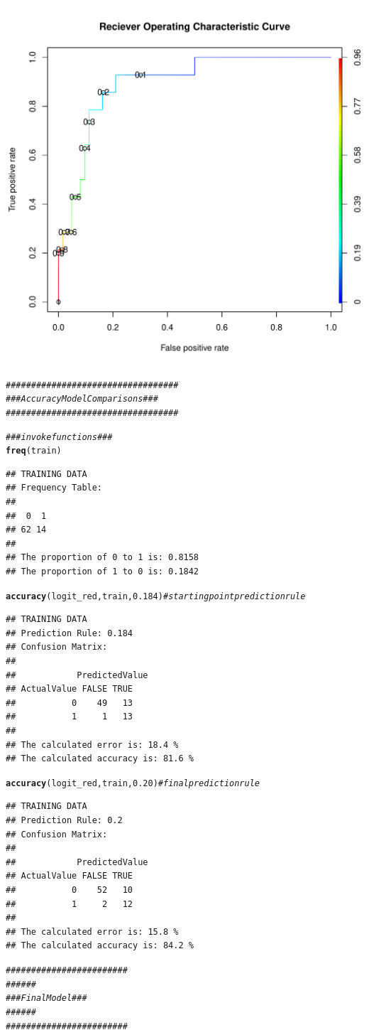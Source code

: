 \documentclass{article}\usepackage[]{graphicx}\usepackage[]{color}
\makeatletter
\def\maxwidth{ %
  \ifdim\Gin@nat@width>\linewidth
    \linewidth
  \else
    \Gin@nat@width
  \fi
}
\newcommand{\hlnum}[1]{\textcolor[rgb]{0.686,0.059,0.569}{#1}}%
\newcommand{\hlcom}[1]{\textcolor[rgb]{0.678,0.584,0.686}{\textit{#1}}}%
\newcommand{\hlstd}[1]{\textcolor[rgb]{0.345,0.345,0.345}{#1}}%
\newcommand{\hlkwd}[1]{\textcolor[rgb]{0.737,0.353,0.396}{\textbf{#1}}}%
\newenvironment{kframe}{%
 \def\at@end@of@kframe{}%
 \ifinner\ifhmode%
  \def\at@end@of@kframe{\end{minipage}}%
  \begin{minipage}{\columnwidth}%
 \fi\fi%
 \def\FrameCommand##1{\hskip\@totalleftmargin \hskip-\fboxsep
 \colorbox{shadecolor}{##1}\hskip-\fboxsep
     \hskip-\linewidth \hskip-\@totalleftmargin \hskip\columnwidth}%
 \MakeFramed {\advance\hsize-\width
   \@totalleftmargin\z@ \linewidth\hsize
   \@setminipage}}%
 {\par\unskip\endMakeFramed%
 \at@end@of@kframe}
\newenvironment{knitrout}{}{} %
\makeatother
\begin{document}
\begin{knitrout}
\includegraphics[width=\maxwidth]{figure/unnamed-chunk-1-3} 
\begin{kframe}\begin{alltt}
\hlcom{##################################}
\hlcom{### Accuracy Model Comparisons ###}
\hlcom{##################################}

\hlcom{### invoke functions ###}
\hlkwd{freq}\hlstd{(train)}
\end{alltt}
\begin{verbatim}
## TRAINING DATA
## Frequency Table:
## 
##  0  1 
## 62 14 
## 
## The proportion of 0 to 1 is: 0.8158 
## The proportion of 1 to 0 is: 0.1842
\end{verbatim}
\begin{alltt}
\hlkwd{accuracy}\hlstd{(logit_red, train,} \hlnum{0.184}\hlstd{)} \hlcom{# starting point prediction rule}
\end{alltt}
\begin{verbatim}
## TRAINING DATA
## Prediction Rule: 0.184 
## Confusion Matrix:
##  
##            PredictedValue
## ActualValue FALSE TRUE
##           0    49   13
##           1     1   13
## 
## The calculated error is: 18.4 %
## The calculated accuracy is: 81.6 %
\end{verbatim}
\begin{alltt}
\hlkwd{accuracy}\hlstd{(logit_red, train,} \hlnum{0.20}\hlstd{)} \hlcom{# final prediction rule}
\end{alltt}
\begin{verbatim}
## TRAINING DATA
## Prediction Rule: 0.2 
## Confusion Matrix:
##  
##            PredictedValue
## ActualValue FALSE TRUE
##           0    52   10
##           1     2   12
## 
## The calculated error is: 15.8 %
## The calculated accuracy is: 84.2 %
\end{verbatim}
\begin{alltt}
\hlcom{########################}
\hlcom{###                  ###}
\hlcom{###    Final Model   ###}
\hlcom{###                  ###}
\hlcom{########################}


\end{alltt}
\end{kframe}
\end{knitrout}
\end{document}
